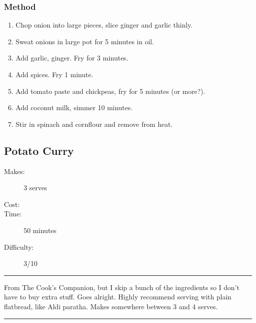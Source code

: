 \documentclass[]{article}
\begin{document}
\subsubsection*{\Large Method}
\begin{enumerate}[font=\huge\color{accent}]
	\item Chop onion into large pieces, slice ginger and garlic thinly.
	\item Sweat onions in large pot for 5 minutes in oil.
	\item Add garlic, ginger. Fry for 3 minutes.
	\item Add spices. Fry 1 minute.
	\item Add tomato paste and chickpeas, fry for 5 minutes (or more?).
	\item Add coconut milk, simmer 10 minutes.
	\item Stir in spinach and cornflour and remove from heat.
\end{enumerate}
\newpage
{}\label{rec:Potato Curry}
\subsection*{\center\huge Potato Curry}
\begin{description}
\item[Makes:] 3 serves
\item[Cost:] \textdollar
\item[Time:] 50 minutes
\item[Difficulty:] 3/10
\end{description}
\vspace{0.2cm}\hrule\vspace{0.5cm}
\begin{adjustwidth}{0.5 cm}{0.5 cm}

From The Cook's Companion, but I skip a bunch of the ingredients so I don't have to buy extra stuff. Goes alright. Highly recommend serving with plain flatbread, like Aldi paratha. Makes somewhere between 3 and 4 serves. \hfill{}\color{black}

\end{adjustwidth}
\vspace{0.5cm}\hrule
\end{document}
